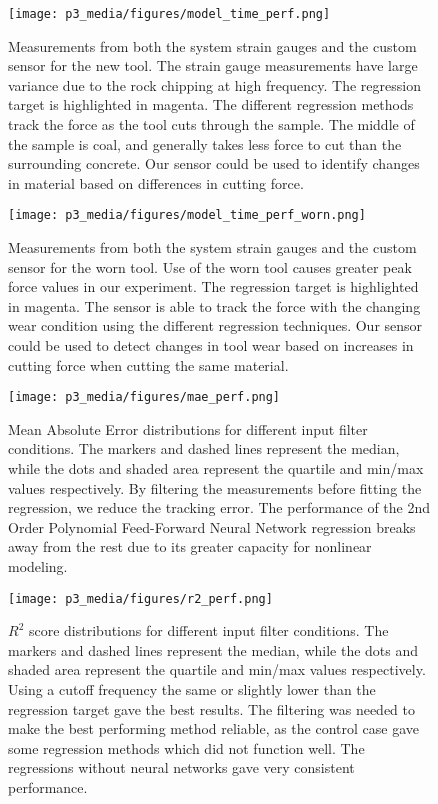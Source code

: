 \FloatBarrier

\begin{figure}[t]
\centering
\texttt{[image: p3\_media/figures/model\_time\_perf.png]}
\caption{
Measurements from both the system strain gauges and the custom sensor for the new tool. 
The strain gauge measurements have large variance due to the rock chipping at high frequency.
The regression target is highlighted in magenta. The different regression methods track the force
as the tool cuts through the sample. The middle of the sample is coal, and generally takes less force
to cut than the surrounding concrete.
Our sensor could be used to identify changes in material based on differences in cutting force.
}
\label{fig:sensor_rock_cut}
\end{figure}

\begin{figure}[h]
\centering
\texttt{[image: p3\_media/figures/model\_time\_perf\_worn.png]}
\caption{
Measurements from both the system strain gauges and the custom sensor for the worn tool. 
Use of the worn tool causes greater peak force values in our experiment.
The regression target is highlighted in magenta.
The sensor is able to track the force with the changing wear condition
using the different regression techniques.
Our sensor could be used to detect changes in tool wear based on increases in cutting force
when cutting the same material.
}
\label{fig:sensor_rock_cut_worn}
\end{figure}


\begin{figure}[t]
\centering
\texttt{[image: p3\_media/figures/mae\_perf.png]}
\caption{
Mean Absolute Error distributions for different input filter conditions.
The markers and dashed lines represent the median, while the dots and shaded area represent
the quartile and min/max values respectively.
By filtering the measurements
before fitting the regression, we reduce the tracking error.
The performance of the 2nd Order Polynomial Feed-Forward Neural Network
regression breaks away from the rest due to its greater capacity for nonlinear modeling.
}
\label{fig:MAE}
\end{figure}

\begin{figure}[h]
\centering
\texttt{[image: p3\_media/figures/r2\_perf.png]}
\caption{
$R^2$ score distributions for different input filter conditions.
The markers and dashed lines represent the median, while the dots and shaded area represent
the quartile and min/max values respectively.
Using a cutoff frequency the same or slightly lower than the regression target gave 
the best results.
The filtering was needed to make the best performing method reliable, as the control case
gave some regression methods which did not function well.
The regressions without neural networks gave very consistent performance.
} 
\label{fig:adjr2}
\end{figure}

